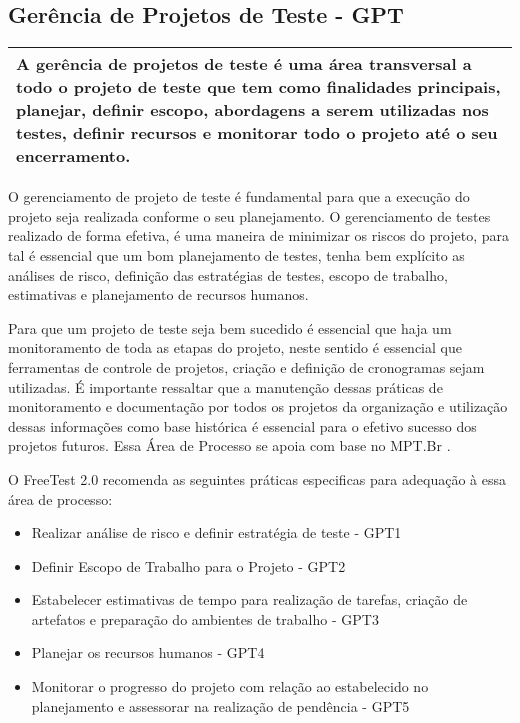 \subsection{Gerência de Projetos de Teste - GPT}
\label{sec:gerenciadeprojetosdeteste}


\begin{table}[H]
\centering
\begin{tabular}{|p{130mm}|}
\hline
A gerência de projetos de teste é uma área transversal a todo o projeto de teste que tem como finalidades principais, planejar, definir escopo, abordagens a serem utilizadas nos testes, definir recursos e monitorar todo o projeto até o seu encerramento.\\
\hline
\end{tabular}
\end{table}

O gerenciamento de projeto de teste é fundamental para que a execução do projeto seja realizada conforme o seu planejamento. O gerenciamento de testes realizado de forma efetiva, é uma maneira de minimizar os riscos do projeto, para tal é essencial que um bom planejamento de testes, tenha bem explícito as análises de risco, definição das estratégias de testes, escopo de trabalho, estimativas e planejamento de recursos humanos.

Para que um projeto de teste seja bem sucedido é essencial que haja um monitoramento de toda as etapas do projeto, neste sentido é essencial que ferramentas de controle de projetos, criação e definição de cronogramas sejam utilizadas. É importante ressaltar que a manutenção dessas práticas de monitoramento e documentação por todos os projetos da organização e utilização dessas informações como base histórica é essencial para o efetivo sucesso dos projetos futuros. Essa Área de Processo se apoia com base no MPT.Br \cite{GuiaMPTbr}.

O FreeTest 2.0 recomenda as seguintes práticas especificas para adequação à essa área de processo:

\begin{itemize}    
    \item Realizar análise de risco e definir estratégia de teste - GPT1
    \item Definir Escopo de Trabalho para o Projeto - GPT2
    \item Estabelecer estimativas de tempo para realização de tarefas, criação de artefatos e preparação do ambientes de trabalho - GPT3
    \item Planejar os recursos humanos - GPT4
    \item Monitorar o progresso do projeto com relação ao estabelecido no planejamento e assessorar na realização de pendência - GPT5
\end{itemize}

